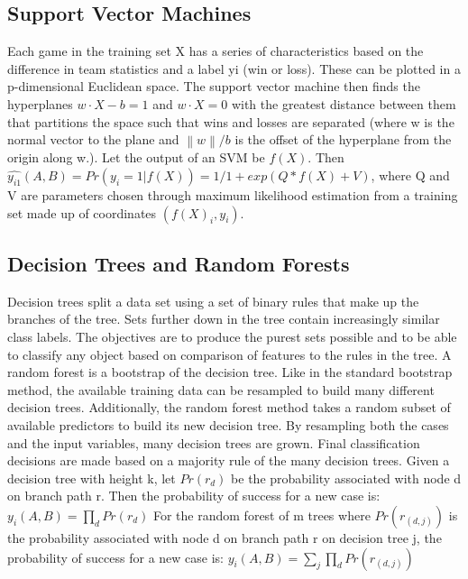 \documentclass{article}
\begin{document}
\begin{multicols}{2}
	\subsection{Support Vector Machines}
	Each game in the training set X has a series of characteristics based on the difference in team statistics and a label yi (win or loss). These can be plotted in a p-dimensional Euclidean space. The support vector machine then finds the hyperplanes $w·X-b = 1$ and $w ·X = 0$ with the greatest distance between them that partitions the space such that wins and losses are separated (where w is the normal vector to the plane and $\left \| w \right \|/b$ is the offset of the hyperplane from the origin along w.)\cite{4}. Let the output of an SVM be $f(X)$. Then
	\linebreak
	\linebreak
$\hat{y_{i1}}(A,B)  = Pr(y_i = 1| f(X)) = 1/ 1+exp(Q * f(X) +V)$,
	\linebreak
	\linebreak
where Q and V are parameters chosen through maximum likelihood estimation from a training set made up of coordinates $(f(X)_i, y_i)$.\cite{4}

	\subsection{Decision Trees and Random Forests}
	Decision trees split a data set using a set of binary rules that make up the branches of the tree. Sets further down in the tree contain increasingly similar class labels. The objectives are to produce the purest sets possible and to be able to classify any object based on comparison of features to the rules in the tree. A random forest is a bootstrap of the decision tree. Like in the standard bootstrap method, the available training data can be resampled to build many different decision trees. Additionally, the random forest method takes a random subset of available predictors to build its new decision tree. By resampling both the cases and the input
variables, many decision trees are grown. Final classification decisions are made based on a majority rule of the many decision trees. Given a decision tree with height k, let $Pr(r_d)$ be the probability associated with node d on branch path r. Then the probability of success for a new case is:
	$y_i(A,B)=\prod_{d} Pr(r_d)$
	\linebreak
	\linebreak
For the random forest of m trees where $Pr(r_{(d, j)}
)$ is the probability associated with node
d on branch path r on decision tree j, the probability of success for a new case is:
	$y_i(A,B)=\sum_{j}\prod_{d} Pr(r_{(d,j)})$
	\linebreak
	\linebreak
	
	\end{multicols} 
\end{document}
